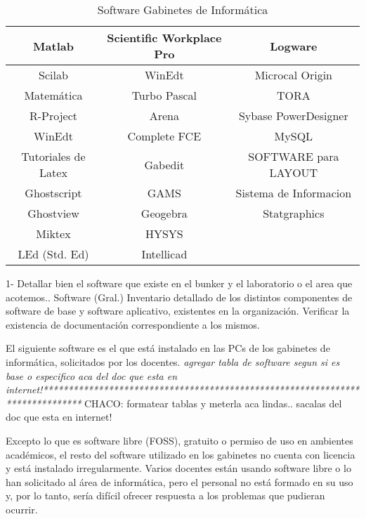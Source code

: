 \documentclass[10pt,a4paper,final]{article}
\begin{document}
\begin{table}
\caption{Software Gabinetes de Informática}
\begin{center}\begin{tabular}{ccc}
\hline Matlab & Scientific Workplace Pro & Logware\\
\hline Scilab & WinEdt  & Microcal Origin\\
\hline Matemática & Turbo Pascal & TORA\\
\hline R-Project & Arena  & Sybase PowerDesigner\\
\hline WinEdt & Complete FCE & MySQL\\
\hline Tutoriales de Latex & Gabedit & SOFTWARE para LAYOUT\\
\hline Ghostscript & GAMS & Sistema de Informacion\\
\hline Ghostview & Geogebra & Statgraphics\\
\hline Miktex & HYSYS\\
\hline LEd (Std. Ed) & Intellicad\\
\hline
\end{tabular}\end{center}
\end{table}

1- Detallar bien el software que existe en el bunker y el laboratorio o el area que acotemos..
Software (Gral.)
Inventario detallado de los distintos componentes de software de base y software aplicativo, existentes en la organización.
Verificar la existencia de documentación correspondiente a los mismos.


El siguiente software es el que está instalado en las PCs de los gabinetes de informática, solicitados por los docentes. 
\emph{agregar tabla de software segun si es base o especifico aca del doc que esta en internet!******************************************************************************}
CHACO: formatear tablas y meterla aca lindas.. sacalas del doc que esta en internet!

Excepto lo que es software libre (FOSS), gratuito o permiso de uso en ambientes académicos, el resto del software utilizado en los gabinetes no cuenta con licencia y está instalado irregularmente. Varios docentes están usando software libre o lo han solicitado al área de informática, pero el personal no está formado en su uso y, por lo tanto, sería difícil ofrecer respuesta a los problemas que pudieran ocurrir.
\end{document}
